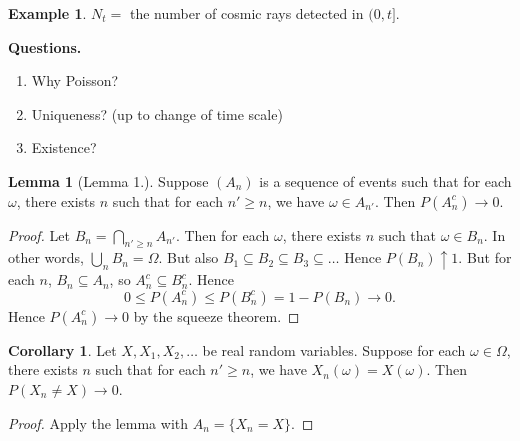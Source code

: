 \documentclass{article}
\theoremstyle{definition}
\newtheorem{corollary}[theorem]{Corollary}
\newtheorem{lemma}[theorem]{Lemma}
\newtheorem*{example}{Example}
\begin{document}
\begin{example}
$N_t =$ the number of cosmic rays detected in $(0, t]$. 
\end{example}

\textbf{Questions.}
\begin{enumerate}
    \item Why Poisson?
    \item Uniqueness? (up to change of time scale)
    \item Existence?
\end{enumerate}

\begin{lemma}[Lemma 1.]
    Suppose $(A_n)$ is a sequence of events such that for each $\omega$, there exists $n$ such that for each $n' \geq n$, we have $\omega \in A_{n'}$. Then $P(A_n^c) \to 0$.
\end{lemma}
\begin{proof}
Let $B_n = \bigcap_{n' \geq n} A_{n'}$. Then for each $\omega$, there exists $n$ such that $\omega \in B_n$. In other words, $\bigcup_n B_n = \Omega$. But also $B_1 \subseteq B_2 \subseteq B_3 \subseteq \dots$ Hence $P(B_n) \uparrow 1$. But for each $n$, $B_n \subseteq A_n$, so $A_n^c \subseteq B_n^c$. Hence
\[
    0 \leq P(A_n^c) \leq P(B_n^c) = 1 - P(B_n) \to 0.
\]
Hence $P(A_n^c) \to 0$ by the squeeze theorem.
\end{proof}

\begin{corollary}
    Let $X, X_1, X_2, \dots$ be real random variables. Suppose for each $\omega \in \Omega$, there exists $n$ such that for each $n' \geq n$, we have $X_n(\omega) = X(\omega)$. Then $P(X_n \neq X) \to 0$.
\end{corollary}
\begin{proof}
Apply the lemma with $A_n = \{X_n = X\}$.
\end{proof}
\end{document}
